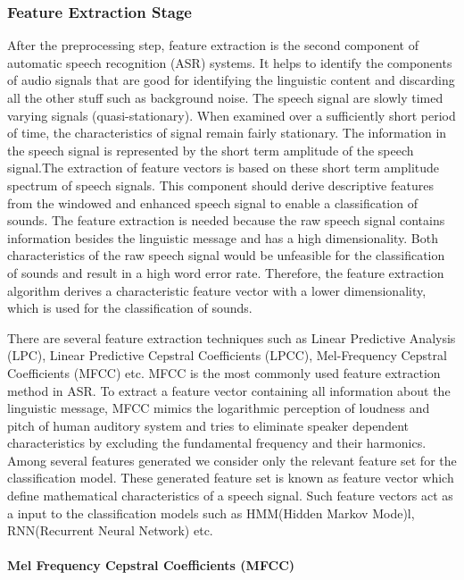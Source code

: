 \subsubsection{Feature Extraction Stage}
After the preprocessing step, feature extraction is the second component of automatic speech recognition (ASR) systems. It helps to identify the components of audio signals that are good for identifying the linguistic content and discarding all the other stuff such as background noise. The speech signal are slowly timed varying signals (quasi-stationary). When examined over a sufficiently short period of time, the characteristics of signal remain fairly stationary. The information in the speech signal is represented by the short term amplitude of the speech signal.The extraction of feature vectors is based on these short term amplitude spectrum of speech signals. This component should derive descriptive features from the windowed and enhanced speech signal to enable a classification of sounds. The feature extraction is needed because the raw speech signal contains information besides the linguistic message and has a high dimensionality. Both characteristics of the raw speech signal would be unfeasible for the classification of sounds and result in a high word error rate. Therefore, the feature extraction algorithm derives a characteristic feature vector with a lower dimensionality, which is used for the classification of sounds. 


There are several feature extraction techniques such as Linear Predictive Analysis (LPC), Linear Predictive Cepstral Coefficients (LPCC), Mel-Frequency Cepstral Coefficients (MFCC) etc. MFCC is the most commonly used feature extraction method in ASR. To extract a feature vector containing all information about the linguistic message, MFCC mimics the logarithmic perception of loudness and pitch of human auditory system and tries to eliminate speaker dependent characteristics by excluding the fundamental frequency and their harmonics. Among several features generated we consider only the relevant feature set for the classification model. These generated feature set is known as feature vector which define mathematical characteristics of a speech signal. Such feature vectors act as a input to the classification models such as HMM(Hidden Markov Mode)l, RNN(Recurrent Neural Network) etc.\\


\paragraph{Mel Frequency Cepstral Coefficients (MFCC)} \mbox{}


